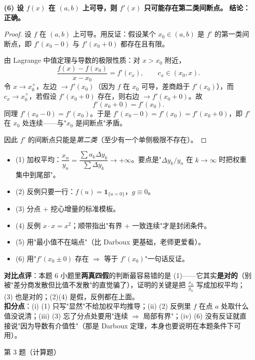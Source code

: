 \documentclass[10pt]{ctexart}
\newcommand{\Qhead}[2]{%
  \begin{tcolorbox}[enhanced,colback=graybg,colframe=acc,
    boxrule=0pt,leftrule=3pt,arc=2pt,top=3pt,bottom=3pt,left=8pt,right=8pt]
  {\heiti\color{acc}#1}\quad #2
  \end{tcolorbox}}
\newcommand{\Vhead}[1]{\vspace{2pt}{\heiti\color{acc2}#1}\par\vspace{-2pt}}
\begin{document}
\vspace{2pt}
\textbf{(6) 设 $f(x)$ 在 $(a,b)$ 上可导，则 $f'(x)$ 只可能存在第二类间断点。}
\noindent\textbf{结论：正确。}
\begin{proof}
设 $f$ 在 $(a,b)$ 上可导。用反证：假设某个 $x_0\in(a,b)$ 是 $f'$ 的第一类间断点，即 $f'(x_0-0)$ 与 $f'(x_0+0)$ 都存在且有限。

由 Lagrange 中值定理与导数的极限性质：对 $x>x_0$ 附近，
\[
\frac{f(x)-f(x_0)}{x-x_0}=f'(c_x),\qquad c_x\in(x_0,x) .
\]
令 $x\to x_0^+$，左边 $\to f'(x_0)$（因为 $f$ 在 $x_0$ 可导，差商趋于 $f'(x_0)$），而 $c_x\to x_0^+$，若假设 $f'(x_0+0)$ 存在，则右边 $\to f'(x_0+0)$。故
\[
f'(x_0+0)=f'(x_0).
\]
同理 $f'(x_0-0)=f'(x_0)$。于是 $f'(x_0-0)=f'(x_0)=f'(x_0+0)$，即 $f'$ 在 $x_0$ 处连续——与"$x_0$ 是间断点"矛盾。

因此 $f'$ 的间断点只能是\emph{第二类}（至少有一个单侧极限不存在）。
\end{proof}

\Vhead{版本 B：每题"最短可得分"写法}
\begin{itemize}
\item (1) 加权平均：$\dfrac{x_n}{y_n}=\dfrac{\sum a_k\Delta y_k}{\sum\Delta y_k}\to+\infty$。要点是"$\Delta y_k/y_n$ 在 $k\to\infty$ 时把权重集中到尾部"。
\item (2) 反例只要一行：$f(u)=\mathbf 1_{\{u=0\}}$，$g\equiv0$。
\item (3) 分点 + 挖心增量的标准模板。
\item (4) 反例 $x\cdot x=x^2$；顺带指出"有界 + 一致连续"才是封闭条件。
\item (5) 用"最小值不在端点"（比 Darboux 更基础，老师更爱看）。
\item (6) 用"$f'(x_0\pm0)$ 存在 $\Rightarrow$ 等于 $f'(x_0)$"一句话反证。
\end{itemize}

\begin{cmpbox}
\textbf{对比点评}：本题 6 小题里\textbf{两真四假}的判断最容易错的是 (1)——它其实\textbf{是对的}（别被"差分商发散但比值不发散"的直觉骗了），证明的关键是把 $\frac{x_n}{y_n}$ 写成加权平均；(3) 也是对的；(2)(4) 是假，反例都在上面。\\
\textbf{扣分点}：(i) (1) 只写"显然"不给加权平均推导；(ii) (2) 反例里 $f$ 在点 $a$ 处取什么值没说清；(iii) (3) 忘了分点处要用"连续 $\Rightarrow$ 局部有界"；(iv) (6) 没有反证就直接说"因为导数有介值性"（那是 Darboux 定理，本身也要说明在本题条件下可用）。
\end{cmpbox}

\Qhead{第 3 题（计算题）}{}
\end{document}
